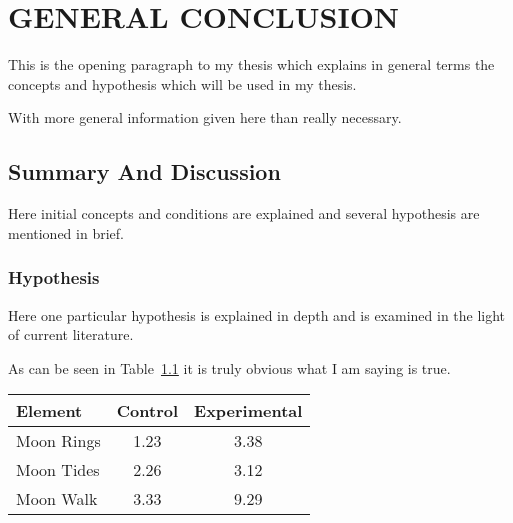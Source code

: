 \chapter{GENERAL CONCLUSION}
\label{future-work}


This is the opening paragraph to my thesis which
explains in general terms the concepts and hypothesis
which will be used in my thesis.

With more general information given here than really
necessary.

\section{Summary And Discussion}

Here initial concepts and conditions are explained and
several hypothesis are mentioned in brief.


\subsection{Hypothesis}

Here one particular hypothesis is explained in depth
and is examined in the light of current literature.

As can be seen in Table~\ref{nothingelse} it is
truly obvious what I am saying is true.
\begin{landscape}
\hfill
\vfill
\begin{table}[h!] \centering
{}
\label{nothingelse}
\begin{tabular}{lcc} \hline
\textbf{Element} & \textbf{Control} & \textbf{Experimental} \\ \hline
Moon Rings & 1.23 & 3.38 \\
Moon Tides & 2.26 & 3.12 \\
Moon Walk & 3.33 & 9.29 \\ \hline
\end{tabular}
\end{table}
\hfill
\vfill
\end{landscape}

